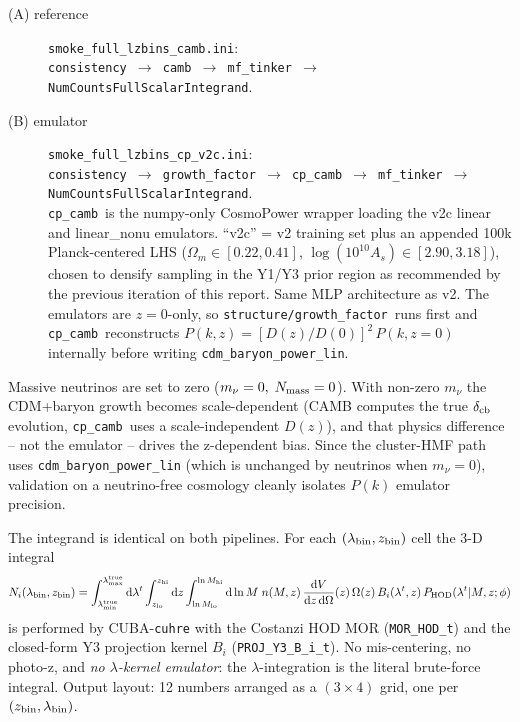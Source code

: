 \documentclass[11pt]{article}
\newcommand{\cp}{\texttt{cp\_camb}}
\newcommand{\gfmod}{\texttt{structure/growth\_factor}}
\newcommand{\ncfull}{\texttt{NumCountsFullScalarIntegrand}}
\begin{document}
\begin{description}
  \item[(A) reference]
    \texttt{smoke\_full\_lzbins\_camb.ini}:\\
    \texttt{consistency $\to$ camb $\to$ mf\_tinker $\to$ \ncfull}.
  \item[(B) emulator]
    \texttt{smoke\_full\_lzbins\_cp\_v2c.ini}:\\
    \texttt{consistency $\to$ growth\_factor $\to$ cp\_camb $\to$
    mf\_tinker $\to$ \ncfull}.\\
    \cp\ is the numpy-only CosmoPower wrapper loading the v2c linear
    and linear\_nonu emulators. ``v2c'' = v2 training set plus an
    appended 100k Planck-centered LHS
    ($\Omega_m\in[0.22, 0.41]$, $\log(10^{10}A_s)\in[2.90, 3.18]$),
    chosen to densify sampling in the Y1/Y3 prior region as
    recommended by the previous iteration of this report. Same
    MLP architecture as v2. The emulators are $z=0$-only, so
    \gfmod\ runs first and \cp\ reconstructs
    $P(k,z) = [D(z)/D(0)]^2\,P(k,z{=}0)$ internally before writing
    \texttt{cdm\_baryon\_power\_lin}.
\end{description}

Massive neutrinos are set to zero ($m_\nu = 0,\;N_{\rm mass} = 0$).
With non-zero $m_\nu$ the CDM+baryon growth becomes scale-dependent
(CAMB computes the true $\delta_{\rm cb}$ evolution, \cp\ uses a
scale-independent $D(z)$), and that physics difference -- not the
emulator -- drives the z-dependent bias. Since the cluster-HMF path
uses \texttt{cdm\_baryon\_power\_lin} (which is unchanged by neutrinos
when $m_\nu=0$), validation on a neutrino-free cosmology cleanly
isolates $P(k)$ emulator precision.

\noindent The integrand is identical on both pipelines. For each
$(\lambda_{\rm bin}, z_{\rm bin})$ cell the 3-D integral
\[
  N_i(\lambda_{\rm bin}, z_{\rm bin})
  = \int_{\lambda^{\rm true}_{\min}}^{\lambda^{\rm true}_{\max}} \mathrm{d}\lambda^t
    \int_{z_{\rm lo}}^{z_{\rm hi}} \mathrm{d}z
    \int_{\ln M_{\rm lo}}^{\ln M_{\rm hi}} \mathrm{d}\ln M\;
    n(M, z)\,\frac{\mathrm{d}V}{\mathrm{d}z\,\mathrm{d}\Omega}(z)\,
    \Omega(z)\,B_i(\lambda^t, z)\,P_{\rm HOD}(\lambda^t | M, z; \phi)
\]
is performed by CUBA-\texttt{cuhre} with the Costanzi HOD MOR
(\texttt{MOR\_HOD\_t}) and the closed-form Y3 projection kernel
$B_i$ (\texttt{PROJ\_Y3\_B\_i\_t}). No mis-centering, no photo-z,
and \emph{no $\lambda$-kernel emulator}: the $\lambda$-integration is the literal
brute-force integral. Output layout: 12 numbers arranged as a
$(3 \times 4)$ grid, one per $(z_{\rm bin}, \lambda_{\rm bin})$.
\end{document}
